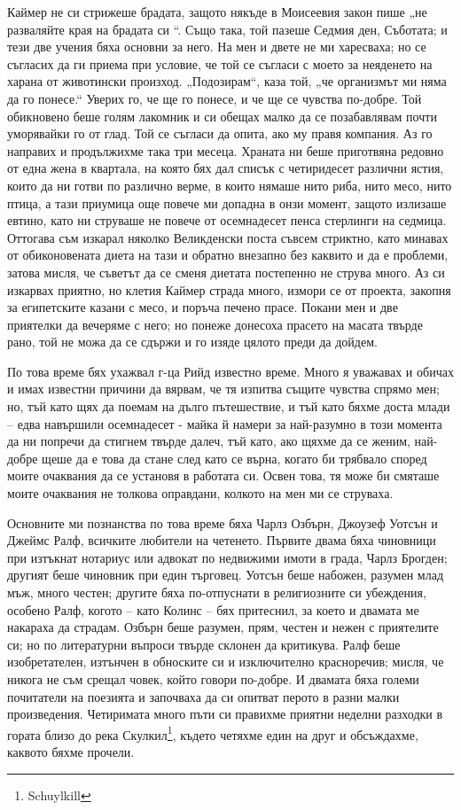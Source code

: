 \documentclass[12pt]{book}
\begin{document}
Каймер не си стрижеше брадата, защото някъде в Моисеевия закон пише „не разваляйте края на брадата си “. Също така, той пазеше Седмия ден, Съботата; и тези две учения бяха основни за него. На мен и двете не ми харесваха; но се съгласих да ги приема при условие, че той се съгласи с моето за неяденето на харана от животински произход. „Подозирам“, каза той, „че организмът ми няма да го понесе.“ Уверих го, че ще го понесе, и че ще се чувства по-добре. Той обикновено беше голям лакомник и си обещах малко да се позабавлявам почти уморявайки го от глад. Той се съгласи да опита, ако му правя компания. Аз го направих и продължихме така три месеца. Храната ни беше приготвяна редовно от една жена в квартала, на която бях дал списък с четиридесет различни ястия, които да ни готви по различно верме, в които нямаше нито риба, нито месо, нито птица, а тази приумица още повече ми допадна в онзи момент, защото излизаше евтино, като ни струваше не повече от осемнадесет пенса стерлинги на седмица.  Оттогава съм изкарал няколко Великденски поста съвсем стриктно, като минавах от обиконовената диета на тази и обратно внезапно без каквито и да е проблеми, затова мисля, че съветът да се сменя диетата постепенно не струва много. Аз си изкарвах приятно, но клетия Каймер страда много, измори се от проекта, закопня за египетските казани с месо, и поръча печено прасе. Покани мен и две приятелки да вечеряме с него; но понеже донесоха прасето на масата твърде рано, той не можа да се сдържи и го изяде цялото преди да дойдем. 

По това време бях ухажвал г-ца Рийд известно време. Много я уважавах и обичах и имах известни причини да вярвам, че тя изпитва същите чувства спрямо мен; но, тъй като щях да поемам на дълго пътешествие, и тъй като бяхме доста млади – едва навършили осемнадесет -  майка й намери за най-разумно в този момента да ни попречи да стигнем  твърде далеч, тъй като, ако щяхме да се женим, най-добре щеше да е това да стане след като се върна, когато би трябвало според моите очаквания да се установя в работата си. Освен това, тя може би смяташе моите очаквания не толкова оправдани, колкото на мен ми се струваха.

Основните ми познанства по това време бяха Чарлз Озбърн, Джоузеф Уотсън и Джеймс Ралф, всичките любители на четенето. Първите двама бяха чиновници при изтъкнат нотариус или адвокат по недвижими имоти в града, Чарлз Брогден; другият беше чиновник при един търговец. Уотсън беше набожен, разумен млад мъж, много честен; другите бяха по-отпуснати в религиозните си убеждения, особено Ралф, когото  – като Колинс –  бях притеснил, за което и двамата ме накараха да страдам. Озбърн беше разумен, прям, честен и нежен с приятелите си; но по литературни въпроси твърде склонен да критикува. Ралф беше изобретателен, изтънчен в обноските си и изключително красноречив; мисля, че никога не съм срещал човек, който говори по-добре. И двамата бяха големи почитатели на поезията и започваха да си опитват перото в разни малки произведения. Четиримата много пъти си правихме приятни неделни разходки в гората близо до река Скулкил\footnote{Schuylkill}, където четяхме един на друг и обсъждахме, каквото бяхме прочели.
\end{document}
